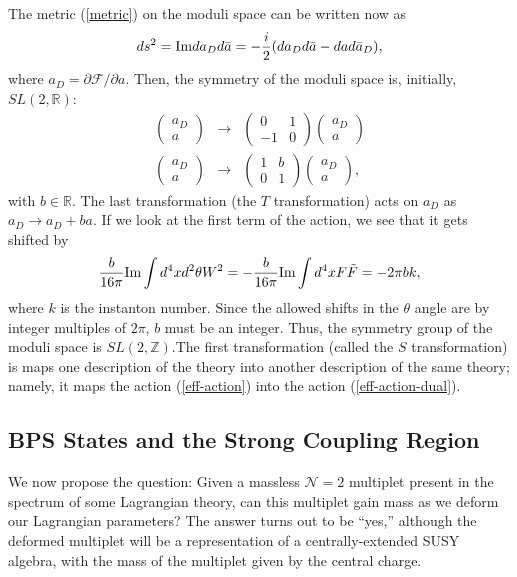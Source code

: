 \documentclass[12pt, onecolumn]{article}
\begin{document}
The metric (\ref{metric}) on the moduli space can be written now as 
\begin{equation}
ds^2 = {\rm Im} da_D d\bar{a} = -\frac{i}{2}(da_D d\bar{a}- d a d \bar{a}_D),
\end{equation} where $a_D=\partial \mathcal{F}/\partial a$. Then, the symmetry of the moduli space is, initially,  $SL(2,\mathbb{R})$:
\begin{eqnarray}
\left(\begin{matrix}
a_D \\ 
a
\end{matrix}\right)&\rightarrow & \left( \begin{matrix} 
0 & 1 \\ 
-1 & 0 \end{matrix} \right) \left(\begin{matrix}
a_D \\ 
a
\end{matrix}\right) \\
\left(\begin{matrix}
a_D \\ 
a
\end{matrix}\right)&\rightarrow & \left( \begin{matrix} 
1 & b \\ 
0 & 1 \end{matrix} \right) \left(\begin{matrix}
a_D \\ 
a
\end{matrix}\right),
\end{eqnarray} with $b\in \mathbb{R}$. The last transformation (the $T$ transformation) acts on $a_D$ as $a_D\rightarrow a_D+ba$. If we look at the first term of the action, we see that it gets shifted by 
\begin{equation}
\frac{b}{16\pi}{\rm Im}\int d^4x d^2\theta W^2 = -\frac{b}{16\pi}{\rm Im}\int d^4xF\tilde{F} = -2\pi b k,
\end{equation} where $k$ is the instanton number. Since the allowed shifts in the $\theta$ angle are by integer multiples of $2\pi$, $b$ must be an integer. Thus, the symmetry group of the moduli space is $SL(2, \mathbb{Z})$.The first transformation (called the $S$ transformation) is maps one description of the theory into another description of the same theory; namely, it maps the action (\ref{eff-action}) into the action (\ref{eff-action-dual}). 

\subsection{BPS States and the Strong Coupling Region}
We now propose the question: Given a massless $\mathcal{N}=2$ multiplet present in the spectrum of some Lagrangian theory, can this multiplet gain mass as we deform our Lagrangian parameters?  The answer turns out to be ``yes,'' although the deformed multiplet will be a representation of a centrally-extended SUSY algebra, with the mass of the multiplet given by the central charge.
\end{document}
